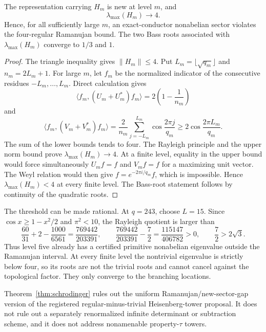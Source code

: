 \begin{theorem}
\label{thm:schrodinger}
The representation carrying \(H_m\) is new at level \(m\), and
\[
\lambda_{\max}(H_m)\longrightarrow4.
\]
Hence, for all sufficiently large \(m\), an exact-conductor nonabelian
sector violates the four-regular Ramanujan bound. The two Bass roots
associated with \(\lambda_{\max}(H_m)\) converge to \(1/3\) and \(1\).
\end{theorem}

\begin{proof}
The triangle inequality gives \(\|H_m\|\le4\). Put
\(L_m=\lfloor\sqrt{q_m}\rfloor\) and
\(n_m=2L_m+1\). For large \(m\), let \(f_m\) be the normalized indicator of
the consecutive residues \(-L_m,\ldots,L_m\). Direct calculation gives
\[
\langle f_m,(U_m+U_m^*)f_m\rangle
=2\left(1-\frac1{n_m}\right)
\]
and
\[
\langle f_m,(V_m+V_m^*)f_m\rangle
=\frac{2}{n_m}\sum_{j=-L_m}^{L_m}
\cos\frac{2\pi j}{q_m}
\ge2\cos\frac{2\pi L_m}{q_m}.
\]
The sum of the lower bounds tends to four. The Rayleigh principle and the
upper norm bound prove \(\lambda_{\max}(H_m)\to4\). At a finite level,
equality in the upper bound would force simultaneously \(U_mf=f\) and
\(V_mf=f\) for a maximizing unit vector. The Weyl relation would then give
\(f=e^{-2\pi i/q_m}f\), which is impossible. Hence
\(\lambda_{\max}(H_m)<4\) at every finite level. The Bass-root statement
follows by continuity of the quadratic roots.
\end{proof}

The threshold can be made rational. At \(q=243\), choose \(L=15\). Since
\(\cos x\ge1-x^2/2\) and \(\pi^2<10\), the Rayleigh quotient is larger than
\[
\frac{60}{31}+2-\frac{1000}{6561}
=\frac{769442}{203391},\qquad
\frac{769442}{203391}-\frac72
=\frac{115147}{406782}>0,
\qquad \frac72>2\sqrt3.
\]
Thus level five already has a certified primitive nonabelian eigenvalue
outside the Ramanujan interval. At every finite level the nontrivial
eigenvalue is strictly below four, so its roots are not the trivial roots and
cannot cancel against the topological factor. They only converge to the
branching locations.

Theorem~\ref{thm:schrodinger} rules out the uniform
Ramanujan/new-sector-gap version of the registered regular-minus-trivial
Heisenberg-tower proposal. It does not rule out a separately renormalized
infinite determinant or subtraction scheme, and it does not address
nonamenable property-\(\tau\) towers.
